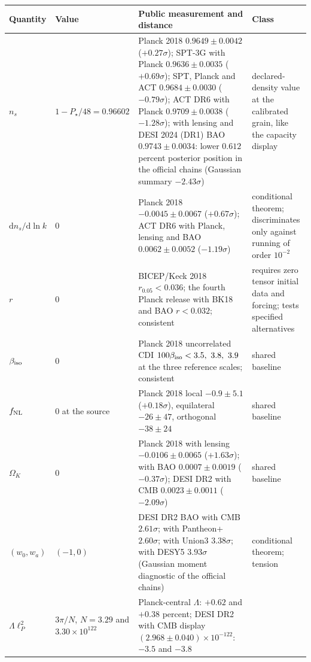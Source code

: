 \documentclass[11pt]{article}
\begin{document}
\begin{table}[t]
\centering\small
\setlength{\tabcolsep}{4pt}
\begin{tabularx}{\textwidth}{@{}l>{\raggedright\arraybackslash}p{}>{\raggedright\arraybackslash}X>{\raggedright\arraybackslash}p{}@{}}
\toprule
Quantity & Value & Public measurement and distance & Class \\
\midrule
\(n_s\) & \(1-P_\star/48=0.96602\) &
Planck 2018 \(0.9649\pm0.0042\) (\(+0.27\sigma\)); SPT-3G with Planck
\(0.9636\pm0.0035\) (\(+0.69\sigma\)); SPT, Planck and ACT
\(0.9684\pm0.0030\) (\(-0.79\sigma\)); ACT DR6 with Planck
\(0.9709\pm0.0038\) (\(-1.28\sigma\)); with lensing and DESI 2024 (DR1)
BAO \(0.9743\pm0.0034\): lower \(0.612\) percent posterior position in the
official chains (Gaussian summary \(-2.43\sigma\)) &
declared-density value at the calibrated grain, like the capacity display \\
\(\mathrm dn_s/\mathrm d\ln k\) & \(0\) &
Planck 2018 \(-0.0045\pm0.0067\) (\(+0.67\sigma\)); ACT DR6 with Planck,
lensing and BAO \(0.0062\pm0.0052\) (\(-1.19\sigma\)) &
conditional theorem; discriminates only against running of order \(10^{-2}\) \\
\(r\) & \(0\) &
BICEP/Keck 2018 \(r_{0.05}<0.036\); the fourth Planck release with BK18 and BAO
\(r<0.032\); consistent &
requires zero tensor initial data and forcing; tests specified alternatives \\
\(\beta_{\rm iso}\) & \(0\) &
Planck 2018 uncorrelated CDI \(100\beta_{\rm iso}<3.5,\ 3.8,\ 3.9\) at the
three reference scales; consistent &
shared baseline \\
\(f_{\rm NL}\) & \(0\) at the source &
Planck 2018 local \(-0.9\pm5.1\) (\(+0.18\sigma\)), equilateral
\(-26\pm47\), orthogonal \(-38\pm24\) &
shared baseline \\
\(\Omega_K\) & \(0\) &
Planck 2018 with lensing \(-0.0106\pm0.0065\) (\(+1.63\sigma\)); with BAO
\(0.0007\pm0.0019\) (\(-0.37\sigma\)); DESI DR2 with CMB
\(0.0023\pm0.0011\) (\(-2.09\sigma\)) &
shared baseline \\
\((w_0,w_a)\) & \((-1,0)\) &
DESI DR2 BAO with CMB \(2.61\sigma\); with Pantheon+ \(2.60\sigma\); with
Union3 \(3.38\sigma\); with DESY5 \(3.93\sigma\) (Gaussian moment
diagnostic of the official chains) &
conditional theorem; tension \\
\(\Lambda\ell_P^2\) & \(3\pi/N\), \(N=3.29\) and \(3.30\times10^{122}\) &
Planck-central \(\Lambda\): \(+0.62\) and \(+0.38\) percent; DESI DR2 with
CMB display \((2.968\pm0.040)\times10^{-122}\): \(-3.5\) and \(-3.8\)

\end{tabularx}
\end{table}
\end{document}
